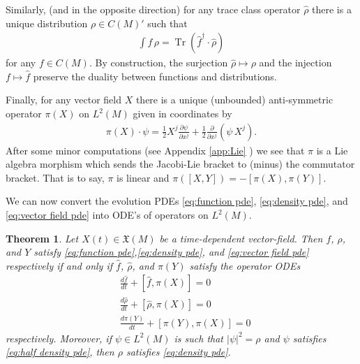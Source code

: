 \documentclass[12pt]{amsart}
\newcommand{\pder}[2]{\ensuremath{\frac{ \partial #1}{\partial #2}}}
\newtheorem{thm}{Theorem}[section]
\DeclareMathOperator{\Tr}{Tr}
\begin{document}
Similarly, (and in the opposite direction) for any trace class operator $\hat{\rho}$ there is a unique distribution $\rho \in C(M)'$ such that 
\begin{align*}
	 \int f \, \rho = \Tr ( \hat{f}^{\dagger} \cdot \hat{\rho} )
\end{align*}
for any $f \in C(M)$.
By construction, the surjection $\hat{\rho} \mapsto \rho$ and the injection $f \mapsto \hat{f}$ preserve the duality between functions and distributions.

Finally, for any vector field $X$ there is a unique (unbounded) anti-symmetric operator $\pi(X)$ on $L^{2}(M)$
given in coordinates by
\begin{align}
	\pi(X) \cdot \psi = \frac{1}{2} X^{j} \pder{\psi}{x^{j}} + \frac{1}{2} \pder{}{x^{j}} ( \psi \, X^{j} ). \label{eq:representation}
\end{align}
After some minor computations (see Appendix \ref{app:Lie}  ) we see that $\pi$ is a Lie algebra morphism which sends
the Jacobi-Lie bracket to (minus) the commutator bracket.  That is to say, $\pi$ is linear and $\pi([X,Y]) = - [ \pi(X) , \pi(Y)]$.

We can now convert the evolution PDEs \eqref{eq:function pde}, \eqref{eq:density pde}, and \eqref{eq:vector field pde}
into ODE's of operators on $L^{2}(M)$.

\begin{thm} \label{thm:quantize}
	Let $X(t) \in \mathfrak{X}(M)$ be a time-dependent vector-field.
	Then $f$, $\rho$, and $Y$ satisfy \eqref{eq:function pde},\eqref{eq:density pde}, and \eqref{eq:vector field pde} respectively
	if and only if $\hat{f}$, $\hat{\rho}$, and $\pi(Y)$ satisfy the operator ODEs
	\begin{align}
		&\frac{d \hat{f} }{dt} + [ \hat{f} , \pi(X) ] = 0 \label{eq:quantum observable ode} \\
		&\frac{d \hat{\rho} }{dt} + [ \hat{\rho} , \pi(X) ] = 0 \label{eq:quantum density ode} \\
		&\frac{d \pi(Y) }{dt} + [ \pi(Y), \pi(X) ] = 0 \label{eq:quantum vf ode}
	\end{align}
	respectively.
	Moreover, if $\psi \in L^{2}(M)$ is such that $|\psi|^{2} = \rho$ and $\psi$ satisfies \eqref{eq:half density pde}, then $\rho$ satisfies \eqref{eq:density pde}.
\end{thm}
\end{document}

